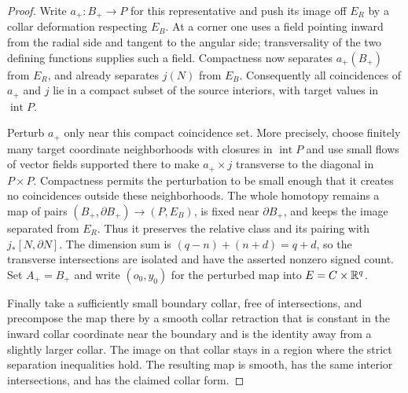 \begin{proof}
Write $a_+:B_+\to P$ for this representative and push its image off
$E_R$ by a collar deformation respecting $E_B$. At a corner one uses a
field pointing inward from the radial side and tangent to the angular
side; transversality of the two defining functions supplies such a field.
Compactness now separates $a_+(B_+)$ from $E_R$, and already separates
$j(N)$ from $E_B$. Consequently all coincidences of $a_+$ and $j$ lie in
a compact subset of the source interiors, with target values in
$\operatorname{int}P$.

Perturb $a_+$ only near this compact coincidence set. More precisely,
choose finitely many target coordinate neighborhoods with closures in
$\operatorname{int}P$ and use small flows of vector fields supported there
to make $a_+\times j$ transverse to the diagonal in $P\times P$.
Compactness permits the perturbation to be small enough that it creates
no coincidences outside these neighborhoods. The whole homotopy remains
a map of pairs $(B_+,\partial B_+)\to(P,E_B)$, is fixed near
$\partial B_+$, and keeps the image separated from $E_R$. Thus it
preserves the relative class and its pairing with $j_*[N,\partial N]$.
The dimension sum is $(q-n)+(n+d)=q+d$, so the transverse intersections
are isolated and have the asserted nonzero signed count. Set $A_+=B_+$
and write $(o_0,y_0)$ for the perturbed map into $E=C\times\mathbb R^q$.

Finally take a sufficiently small boundary collar, free of
intersections, and precompose the map there by a smooth collar
retraction that is constant in the inward collar coordinate near the
boundary and is the identity away from a slightly larger collar.
The image on that collar stays in a region where the strict
separation inequalities hold.  The resulting map is smooth, has the
same interior intersections, and has the claimed collar form.
\end{proof}



